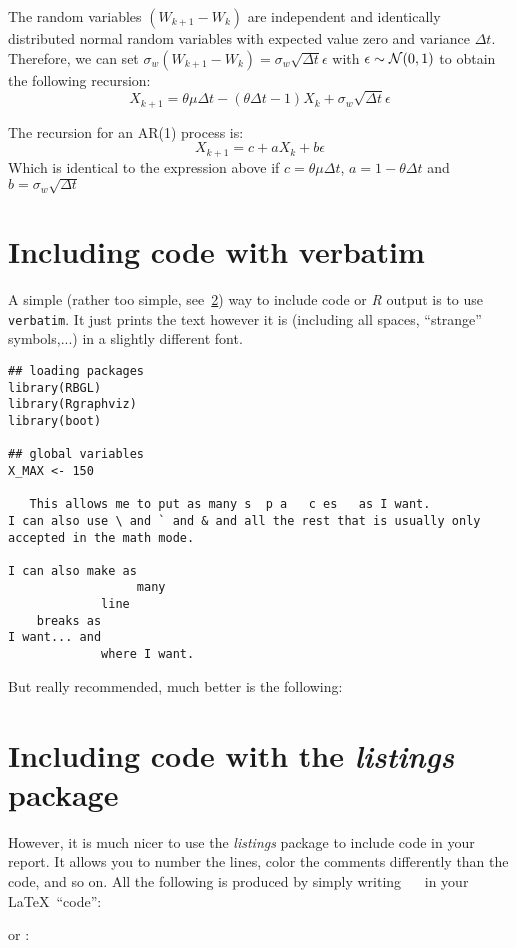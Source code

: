The random variables $(W_{k+1} - W_k)$ are independent and identically distributed normal random variables
with expected value zero and variance $\Delta t$.
Therefore, we can set $\sigma_w (W_{k+1} - W_k) = \sigma_w \sqrt{\Delta t} \epsilon$ with $\epsilon \sim \operatorname{\mathcal{N}}(0,1)$
to obtain the following recursion:
$$ X_{k+1} = \theta \mu \Delta t - (\theta \Delta t - 1) X_k + \sigma_w \sqrt{\Delta t} \epsilon$$

The recursion for an AR(1) process is:
$$ X_{k+1} = c + a X_k + b \epsilon$$
Which is identical to the expression above if $c= \theta \mu \Delta t$, $a=1- \theta \Delta t$ and
$b= \sigma_w \sqrt{\Delta t}$




\section{Including \Rp code with verbatim}
A simple (rather too simple, see~\ref{App:listings}) way to include code or
{\it R} output is to use 
\texttt{verbatim}. It just prints the text however it is (including all
spaces, ``strange'' symbols,...) in a slightly different font.
\begin{verbatim}
## loading packages
library(RBGL)
library(Rgraphviz)
library(boot)

## global variables
X_MAX <- 150

   This allows me to put as many s  p a   c es   as I want.
I can also use \ and ` and & and all the rest that is usually only 
accepted in the math mode.

I can also make as 
                  many 
             line 
    breaks as 
I want... and
             where I want. 
\end{verbatim}

But really recommended,  much better is the following:

\section{Including \Rp code with the \emph{listings} package}\label{App:listings}
However, it is much nicer to use the \emph{listings} package to include \Rp
code in your report. It allows you to number the lines, color the comments
differently than the code, and so on.
All the following is produced by simply writing
\verb!  !  in your \LaTeX\ ``code'':



or \verb!! :

